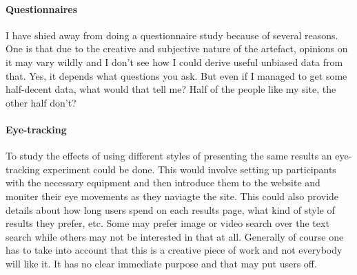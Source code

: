 \paragraph{Questionnaires}
I have shied away from doing a questionnaire study because of several reasons. One is that due to the creative and subjective nature of the artefact, opinions on it may vary wildly and I don't see how I could derive useful unbiased data from that. Yes, it depends what questions you ask. But even if I managed to get some half-decent data, what would that tell me? Half of the people like my site, the other half don't?


\paragraph{Eye-tracking}
To study the effects of using different styles of presenting the same results an eye-tracking experiment could be done. This would involve setting up participants with the necessary equipment and then introduce them to the website and moniter their eye movements as they naviagte the site. This could also provide details about how long users spend on each results page, what kind of style of results they prefer, etc. Some may prefer image or video search over the text search while others may not be interested in that at all. Generally of course one has to take into account that this is a creative piece of work and not everybody will like it. It has no clear immediate purpose and that may put users off.



\stopcontents[chapters]
